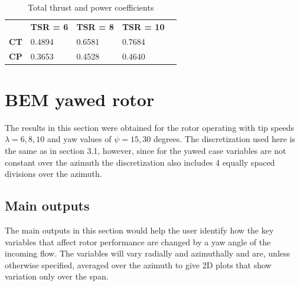 \begin{table}[htpb]
\caption{Total thrust and power coefficients }
\begin{tabular}{lllll}
\cline{2-4}
\multicolumn{1}{l|}{}                            & \multicolumn{1}{l|}{\textbf{TSR = 6}} & \multicolumn{1}{l|}{\textbf{TSR = 8}} & \multicolumn{1}{l|}{\textbf{TSR = 10}} &  \\ \cline{1-4}
\multicolumn{1}{|l|}{\textbf{CT }}   & \multicolumn{1}{l|}{0.4894}          & \multicolumn{1}{l|}{0.6581}          & \multicolumn{1}{l|}{0.7684}           &  \\ \cline{1-4}
\multicolumn{1}{|l|}{\textbf{CP}} & \multicolumn{1}{l|}{0.3653}         & \multicolumn{1}{l|}{0.4528}         & \multicolumn{1}{l|}{0.4640}          &  \\ \cline{1-4}
\end{tabular}
\label{total_coef_alligned}
\end{table}


\section{BEM yawed rotor }

The results in this section were obtained for the rotor operating with tip speeds $\lambda = 6,8,10$ and yaw values of $\psi = 15, 30$ degrees. The discretization used here is the same as in section 3.1, however, since for the yawed case variables are not constant over the azimuth the discretization also includes 4 equally spaced divisions over the azimuth. 


\subsection{Main outputs}

The main outputs in this section would help the user identify how the key variables that affect rotor performance are changed by a yaw angle of the incoming flow. The variables will vary radially and azimuthally and are, unless otherwise specified, averaged over the azimuth to give 2D plots that show variation only over the span.

